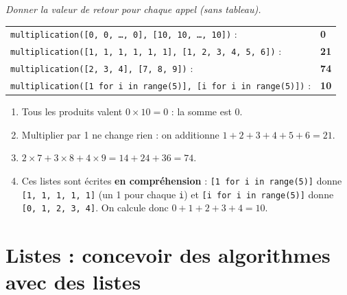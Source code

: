\documentclass[addpoints, 11pt]{exam}
\newcommand{\enonce}[1]{\textit{#1}\par\smallskip}
\newcommand{\code}[1]{\texttt{#1}}
\DeclareRobustCommand{\_}{\textunderscore\allowbreak}
\begin{document}
\begin{questions}
\question[2] \enonce{Donner la valeur de retour pour chaque appel (sans tableau).}
\begin{reponse}
\begin{tabular}{ll}
\code{multiplication([0, 0, \dots, 0], [10, 10, \dots, 10])} : & \textbf{0}\\
\code{multiplication([1, 1, 1, 1, 1, 1], [1, 2, 3, 4, 5, 6])} : & \textbf{21}\\
\code{multiplication([2, 3, 4], [7, 8, 9])} : & \textbf{74}\\
\code{multiplication([1 for i in range(5)], [i for i in range(5)])} : & \textbf{10}\\
\end{tabular}
\end{reponse}
\begin{enumerate}
  \item Tous les produits valent $0 \times 10 = 0$ : la somme est 0.
  \item Multiplier par 1 ne change rien : on additionne $1 + 2 + 3 + 4 + 5 + 6 = 21$.
  \item $2 \times 7 + 3 \times 8 + 4 \times 9 = 14 + 24 + 36 = 74$.
  \item Ces listes sont écrites \textbf{en compréhension} : \code{[1 for i in range(5)]} donne \code{[1, 1, 1, 1, 1]} (un 1 pour chaque \code{i}) et \code{[i for i in range(5)]} donne \code{[0, 1, 2, 3, 4]}. On calcule donc $0 + 1 + 2 + 3 + 4 = 10$.
\end{enumerate}

\section{Listes : concevoir des algorithmes avec des listes}


\end{questions}
\end{document}
